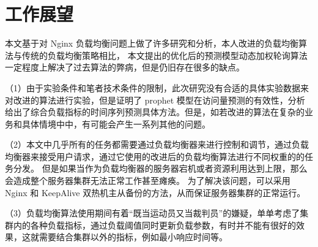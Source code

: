 \section{工作展望}

本文基于对 Nginx 负载均衡问题上做了许多研究和分析，本人改进的负载均衡算法与传统的负载均衡策略相比，
本文提出的优化后的预测模型动态加权轮询算法一定程度上解决了过去算法的弊病，但是仍旧存在很多的缺点。

（1）由于实验条件和笔者技术条件的限制，此次研究没有合适的具体实验数据来对改进的算法进行实验，但是证明了 prophet 模型在访问量预测的有效性，分析给出了综合负载指标的时间序列预测具体方法。但是，如若改进的算法在复杂的业务和具体情境中中，有可能会产生一系列其他的问题。

（2）本文中几乎所有的任务都需要通过负载均衡器来进行控制和调节，通过负载均衡器来接受用户请求，通过它使用的改进后的负载均衡算法进行不同权重的的任务分发。
但是如果当作为负载均衡器的服务器宕机或者资源利用达到上限，那么会造成整个服务器集群无法正常工作甚至瘫痪。
为了解决该问题，可以采用 Nginx 和 KeepAlive 双热机主从备份的方法，从而保证服务器集群的正常运行。

（3）负载均衡算法使用期间有着“既当运动员又当裁判员”的嫌疑，单单考虑了集群内的各种负载指标，通过负载阈值同时更新负载参数，有时并不能有很好的效果，这就需要结合集群以外的指标，例如最小响应时间等。
